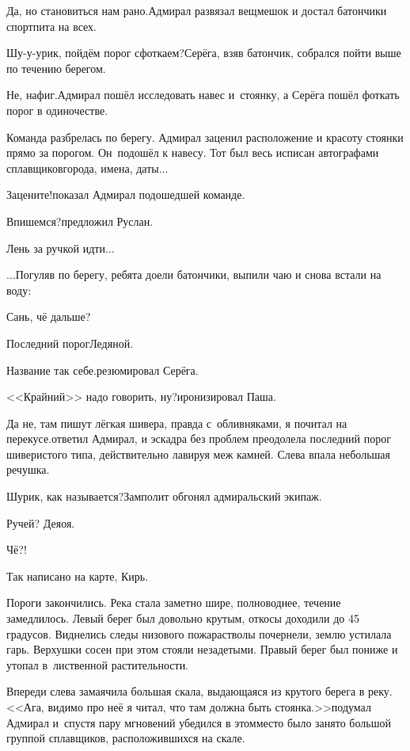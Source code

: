 \diagdash Да, но становиться нам рано.\mdash Адмирал развязал вещмешок и достал батончики спортпита на всех.

\diagdash Шу-у-урик, пойдём порог сфоткаем?\mdash Серёга, взяв батончик, собрался пойти выше по течению берегом.

\diagdash Не, нафиг.\mdash Адмирал пошёл исследовать навес и~стоянку, а Серёга пошёл фоткать порог в одиночестве. 

Команда разбрелась по берегу. Адмирал заценил расположение и красоту стоянки прямо за порогом. Он~подошёл к навесу. Тот был весь исписан автографами сплавщиков\mdash города, имена, даты$\ldots$

\diagdash Зацените!\mdash показал Адмирал подошедшей команде.

\diagdash Впишемся?\mdash предложил Руслан.

\diagdash Лень за ручкой идти$\ldots$

\vspace{0.5cm}
$\ldots$Погуляв по берегу, ребята доели батончики, выпили чаю и снова встали на воду:

\diagdash Сань, чё дальше?

\diagdash Последний порог\mdash Ледяной.

\diagdash Название так себе.\mdash резюмировал Серёга.

\diagdash <<Крайний>> надо говорить, ну?\mdash иронизировал Паша.

\diagdash Да не, там пишут лёгкая шивера, правда с~обливняками, я почитал на перекусе.\mdash ответил Адмирал, и эскадра без проблем преодолела последний порог шиверистого типа, действительно лавируя меж камней. Слева впала небольшая речушка.

\diagdash Шурик, как называется?\mdash Замполит обгонял адмиральский экипаж.

\diagdash Ручей? Деяоя.

\diagdash Чё?!

\diagdash Так написано на карте, Кирь.

Пороги закончились. Река стала заметно шире, полноводнее, течение замедлилось. Левый берег был довольно крутым, откосы доходили до 45 градусов. Виднелись следы низового пожара\mdash стволы почернели, землю устилала гарь. Верхушки сосен при этом стояли незадетыми. Правый берег был пониже и утопал в~лиственной растительности. 

Впереди слева замаячила большая скала, выдающаяся из крутого берега в реку. <<Ага, видимо про неё я читал, что там должна быть стоянка.>>\mdash подумал Адмирал и~спустя пару мгновений убедился в этом\mdash место было занято большой группой сплавщиков, расположившихся на скале.

